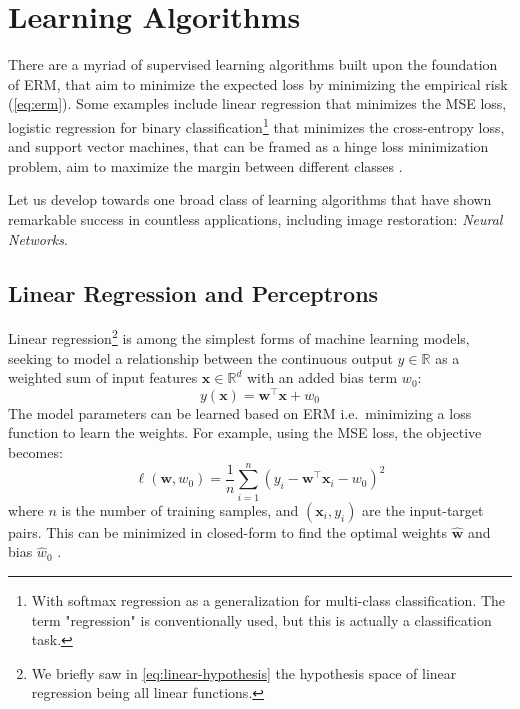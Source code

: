 \section{Learning Algorithms}
There are a myriad of supervised learning algorithms built upon the foundation of \gls{ERM}, that aim to minimize the expected loss by minimizing the empirical risk (\cref{eq:erm}). Some examples include linear regression that minimizes the \gls{MSE} loss, logistic regression for binary classification\footnote{With softmax regression as a generalization for multi-class classification. The term "regression" is conventionally used, but this is actually a classification task.} that minimizes the cross-entropy loss, and support vector machines, that can be framed as a hinge loss minimization problem, aim to maximize the margin between different classes \cite{bishopPatternRecognitionMachine2006}.

Let us develop towards one broad class of learning algorithms that have shown remarkable success in countless applications,  including image restoration: \textit{Neural Networks}.

\subsection{Linear Regression and Perceptrons}
Linear regression\footnote{We briefly saw in \cref{eq:linear-hypothesis} the hypothesis space of linear regression being all linear functions.} is among the simplest forms of machine learning models, seeking to model a relationship between the continuous output $y \in \mathbb{R}$ as a weighted sum of input features $\mathbf{x} \in \mathbb{R}^d$ with an added bias term $w_0$:
\begin{equation}\label{eq:linear-regression}
    y(\mathbf{x}) = \mathbf{w}^\top \mathbf{x} + w_0
\end{equation}
The model parameters can be learned based on \gls{ERM} i.e.\ minimizing a loss function to learn the weights. For example, using the \gls{MSE} loss, the objective becomes:
\begin{equation}\label{eq:mse-loss}
    \ell(\mathbf{w}, w_0) = \frac{1}{n} \sum_{i=1}^{n} (y_i - \mathbf{w}^\top \mathbf{x}_i - w_0)^2
\end{equation}
where $n$ is the number of training samples, and $(\mathbf{x}_i, y_i)$ are the input-target pairs. This can be minimized in closed-form to find the optimal weights $\hat{\mathbf{w}}$ and bias $\hat{w}_0$ \cite{bishopPatternRecognitionMachine2006}.

